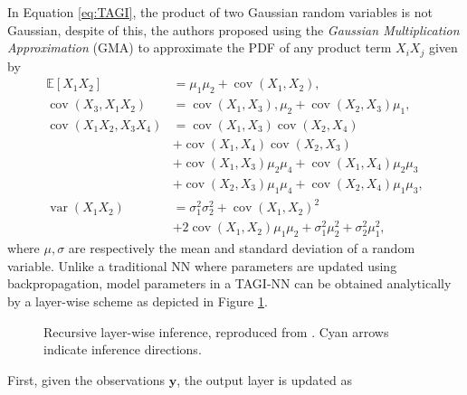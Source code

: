 \documentclass{article}
\begin{document}
In Equation \ref{eq:TAGI}, the product of two Gaussian random variables is not Gaussian, despite of this, the authors proposed using the \textit{Gaussian Multiplication Approximation} (GMA) to approximate the PDF of any product term $X_iX_j$ given by
%
\begin{equation*}
\begin{aligned}
\mathbb{E}\left[X_{1} X_{2}\right] &=\mu_{1} \mu_{2}+\operatorname{cov}\left(X_{1}, X_{2}\right), \\
\operatorname{cov}\left(X_{3}, X_{1} X_{2}\right) &=\operatorname{cov}\left(X_{1}, X_{3}\right), \mu_{2}+\operatorname{cov}\left(X_{2}, X_{3}\right) \mu_{1}, \\
\operatorname{cov}\left(X_{1} X_{2}, X_{3} X_{4}\right) &=\operatorname{cov}\left(X_{1}, X_{3}\right) \operatorname{cov}\left(X_{2}, X_{4}\right) \\
&+\operatorname{cov}\left(X_{1}, X_{4}\right) \operatorname{cov}\left(X_{2}, X_{3}\right) \\
&+\operatorname{cov}\left(X_{1}, X_{3}\right) \mu_{2} \mu_{4}+\operatorname{cov}\left(X_{1}, X_{4}\right) \mu_{2} \mu_{3} \\
&+\operatorname{cov}\left(X_{2}, X_{3}\right) \mu_{1} \mu_{4}+\operatorname{cov}\left(X_{2}, X_{4}\right) \mu_{1} \mu_{3}, \\
\operatorname{var}\left(X_{1} X_{2}\right) &=\sigma_{1}^{2} \sigma_{2}^{2}+\operatorname{cov}\left(X_{1}, X_{2}\right)^{2} \\
&+ 2 \operatorname{cov}\left(X_{1}, X_{2}\right) \mu_{1} \mu_{2}+\sigma_{1}^{2} \mu_{2}^{2}+\sigma_{2}^{2} \mu_{1}^{2},
\end{aligned}
\end{equation*}
where $\mu, \sigma$ are respectively the mean and standard deviation of a random variable. 
Unlike a traditional NN where parameters are updated using backpropagation, model parameters in a TAGI-NN can be obtained analytically by a layer-wise scheme as depicted in Figure \ref{fig:updateTAGI}.
\begin{figure}[htbp]
\centering
\resizebox{0.9\linewidth}{!}{}
\caption{Recursive layer-wise inference, reproduced from \cite{goulet2020tractable}.  Cyan arrows indicate inference directions.}
\label{fig:updateTAGI}
\end{figure}
%
First, given the observations $\bm{y}$, the output layer is updated as
\end{document}
